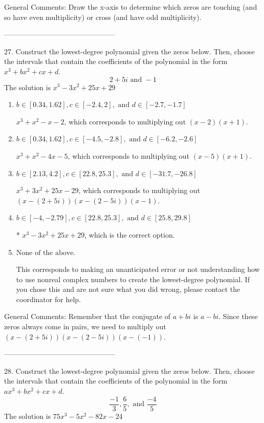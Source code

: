\documentclass{article}[14pt]
\begin{document}
General Comments: Draw the x-axis to determine which zeros are touching (and so have even multiplicity) or cross (and have odd multiplicity).

-----------------------------------------------

27. Construct the lowest-degree polynomial given the zeros below. Then, choose the intervals that contain the coefficients of the polynomial in the form $x^3+bx^2+cx+d$.
$$ 2 + 5i \text{ and } -1 $$ 
The solution is $ x^{3} -3 x^{2} +25 x + 29 $ 

\begin{enumerate}[label=\Alph*.] 
\item $ b \in [0.34, 1.62], c \in [-2.4, 2], \text{ and } d \in [-2.7, -1.7] $ 

 $x^{3} + x^{2} -x -2$, which corresponds to multiplying out $(x -2)(x + 1)$. 
\item $ b \in [0.34, 1.62], c \in [-4.5, -2.8], \text{ and } d \in [-6.2, -2.6] $ 

 $x^{3} + x^{2} -4 x -5$, which corresponds to multiplying out $(x -5)(x + 1)$. 
\item $ b \in [2.13, 4.2], c \in [22.8, 25.3], \text{ and } d \in [-31.7, -26.8] $ 

 $x^{3} +3 x^{2} +25 x -29$, which corresponds to multiplying out $(x-(2 + 5i))(x-(2 - 5i))(x -1)$. 
\item $ b \in [-4, -2.79], c \in [22.8, 25.3], \text{ and } d \in [25.8, 29.8] $ 

 * $x^{3} -3 x^{2} +25 x + 29$, which is the correct option. 
\item $ \text{None of the above.} $ 

 This corresponds to making an unanticipated error or not understanding how to use nonreal complex numbers to create the lowest-degree polynomial. If you chose this and are not sure what you did wrong, please contact the coordinator for help. 
\end{enumerate} 
 
General Comments: Remember that the conjugate of $a+bi$ is $a-bi$. Since these zeros always come in pairs, we need to multiply out $(x-(2 + 5i))(x-(2 - 5i))(x-(-1))$.

-----------------------------------------------

28. Construct the lowest-degree polynomial given the zeros below. Then, choose the intervals that contain the coefficients of the polynomial in the form $ax^3+bx^2+cx+d$.
$$ \frac{-1}{3}, \frac{6}{5}, \text{ and } \frac{-4}{5} $$ 
The solution is $ 75x^{3} -5 x^{2} -82 x -24 $ 
\end{document}
